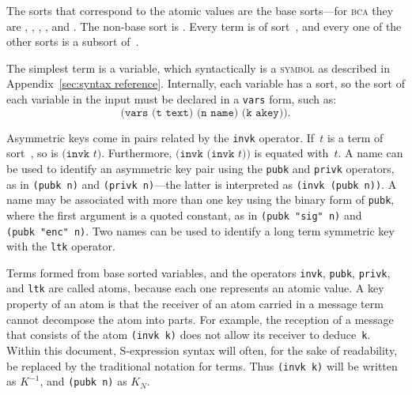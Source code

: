 \documentclass[12pt]{article}
\begin{document}
The sorts that correspond to the atomic values are the base
sorts---for \textsc{bca} they are , , ,
, and .  The non-base sort is
.  Every term is of sort~, and every one of the
other sorts is a subsort of~.

The simplest term is a variable, which syntactically is a
\textsc{symbol} as described in Appendix~\ref{sec:syntax reference}.
Internally, each variable has a sort, so the sort of each variable in
the input must be declared in a \texttt{vars} form, such as:
$$\texttt{(vars (t text) (n name) (k akey))}.$$

Asymmetric keys come in pairs related by the \texttt{invk}
operator.  If~$t$ is a term of sort~, so is
$\texttt{(invk~}t\texttt{)}$.  Furthermore,
$\texttt{(invk~(invk~}t\texttt{))}$ is equated with~$t$.  A name can
be used to identify an asymmetric key pair using the \texttt{pubk} and
\texttt{privk} operators, as in \texttt{(pubk~n)} and
\texttt{(privk~n)}---the latter is interpreted as
\texttt{(invk~(pubk~n))}.  A name may be associated with more than one
key using the binary form of \texttt{pubk}, where the first argument
is a quoted constant, as in
\texttt{(pubk~"sig"~n)} and
\texttt{(pubk~"enc"~n)}.
Two names can be used to identify a long
term symmetric key with the \texttt{ltk} operator.

Terms formed from base sorted variables, and the operators
\texttt{invk}, \texttt{pubk}, \texttt{privk}, and \texttt{ltk} are
called atoms, because each one represents an atomic value.  A key
property of an atom is that the receiver of an atom carried in a
message term cannot decompose the atom into parts.  For example, the
reception of a message that consists of the atom \texttt{(invk~k)}
does not allow its receiver to deduce~\texttt{k}.  Within this
document, S-expression syntax will often, for the sake of readability,
be replaced by the traditional notation for terms.  Thus
\texttt{(invk~k)} will be written as $K^{-1}$, and \texttt{(pubk~n)}
as $K_{N}$.
\end{document}
